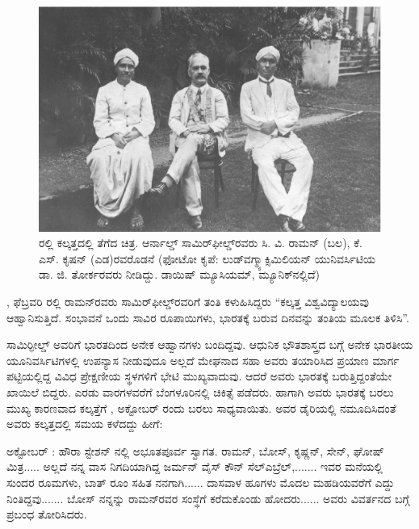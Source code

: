 \vskip 1pt

\begin{figure}[!htbp]
\includegraphics[scale=0.23]{"images/3.jpg"}
\caption{ರಲ್ಲಿ ಕಲ್ಕತ್ತದಲ್ಲಿ ತೆಗೆದ ಚಿತ್ರ. ಆರ್ನಾಲ್ಡ್ ಸಾಮಿರ್‌ಫೀಲ್ಡ್‌ರವರು ಸಿ. ವಿ. ರಾಮನ್ (ಬಲ), ಕೆ. ಎಸ್. ಕೃಷನ್ (ಎಡ)ರವರೊಡನೆ (ಫೋಟೋ ಕೃಪೆ: ಲುಡ್‍ವಗ್\enginline{-}ಮ್ಯಾಕ್ಸಿಮಿಲಿಯನ್ ಯುನಿವರ್ಸಿಟಿಯ ಡಾ. ಜಿ. ತೋರ್ಕರವರು ನೀಡಿದ್ದು. ಡಾಯಿಷ್ ಮ್ಯೂಸಿಯಮ್, ಮ್ಯೂನಿಕ್‍ನಲ್ಲಿದೆ)}\label{chap1-fig04}
\end{figure}

\vskip 2.5pt

, ಫೆಬ್ರವರಿ ರಲ್ಲಿ ರಾಮನ್‍ರವರು ಸಾಮಿರ್‌ಫೀಲ್ಡ್‌ರವರಿಗೆ ತಂತಿ ಕಳುಹಿಸಿದ್ದರು\enginline{-} “ಕಲ್ಕತ್ತ ವಿಶ್ವವಿದ್ಯಾಲಯವು ಆಹ್ವಾನಿಸುತ್ತಿದೆ. ಸಂಭಾವನೆ ಒಂದು ಸಾವಿರ ರೂಪಾಯಿಗಳು, ಭಾರತಕ್ಕೆ ಬರುವ ದಿನವನ್ನು ತಂತಿಯ ಮೂಲಕ ತಿಳಿಸಿ”.

\vskip 2.5pt

ಸಾಮಿರ್‍ಫೀಲ್ಡ್ ಅವರಿಗೆ ಭಾರತದಿಂದ ಅನೇಕ ಆಹ್ವಾನಗಳು ಬಂದಿದ್ದವು. ಆಧುನಿಕ ಭೌತಶಾಸ್ತ್ರದ ಬಗ್ಗೆ ಅನೇಕ ಭಾರತೀಯ ಯೂನಿವರ್ಸಿಟಿಗಳಲ್ಲಿ ಉಪನ್ಯಾಸ ನೀಡುವುದೂ ಅಲ್ಲದೆ ಮೇಘನಾದ ಸಹಾ ಅವರು ತಯಾರಿಸಿದ ಪ್ರಯಾಣ ಮಾರ್ಗ ಪಟ್ಟಿಯಲ್ಲಿದ್ದ ವಿವಿಧ ಪ್ರೇಕ್ಷಣೀಯ ಸ್ಥಳಗಳಿಗೆ ಭೇಟಿ ಮುಖ್ಯವಾದುವು. ಆದರೆ ಅವರು ಭಾರತಕ್ಕೆ ಬರುತ್ತಿದ್ದಂತೆಯೇ ಖಾಯಿಲೆ ಬಿದ್ದರು. ಎರಡು ವಾರಗಳವರೆಗೆ ಬೆಂಗಳೂರಿನಲ್ಲಿ ಚಿಕಿತ್ಸೆ ಪಡೆದರು. ಹಾಗಾಗಿ ಅವರು ಭಾರತಕ್ಕೆ ಬರಲು ಮುಖ್ಯ ಕಾರಣವಾದ ಕಲ್ಕತ್ತೆಗೆ , ಅಕ್ಟೋಬರ್ ರಂದು ಬರಲು ಸಾಧ್ಯವಾಯಿತು. ಅವರ ಡೈರಿಯಲ್ಲಿ ನಮೂದಿಸಿದಂತೆ ಅವರು ಕಲ್ಕತ್ತದಲ್ಲಿ ಸಮಯ ಕಳೆದದ್ದು ಹೀಗೆ:

\vskip 2.5pt

ಅಕ್ಟೋಬರ್ : ಹೌರಾ ಸ್ಟೇಶನ್ ನಲ್ಲಿ ಅಭೂತಪೂರ್ವ ಸ್ವಾಗತ. ರಾಮನ್, ಬೋಸ್, ಕೃಷ್ಣನ್, ಸೇನ್, ಘೋಷ್ ಮಿತ್ರ..... ಅಲ್ಲದೆ ನನ್ನ ವಾಸ ನಿಗದಿಯಾಗಿದ್ದ ಜರ್ಮನ್ ವೈಸ್ ಕೌನ್ ಸೆಲ್\break ಎಬ್ರೆಲ್,....... ಇವರ ಮನೆಯಲ್ಲಿ  ಸುಂದರ ರೂಮಗಳು, ಬಾತ್ ರೂಂ ಸಹಿತ ನನಗಾಗಿ...... ದಾಸವಾಳ ಹೂಗಳು ಮೊದಲ ಮಹಡಿಯವರೆಗೆ ಎದ್ದು ನಿಂತಿದ್ದವು....... ಬೋಸ್ ನನ್ನನ್ನು ರಾಮನ್‍ರವರ ಸಂಸ್ಥೆಗೆ ಕರೆದುಕೊಂಡು ಹೋದರು...... ಅವರು ವಿವರ್ತನದ ಬಗ್ಗೆ ಪ್ರಬಂಧ ತೋರಿಸಿದರು.


